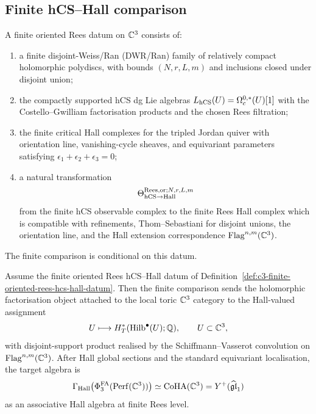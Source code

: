 \subsection*{Finite hCS--Hall comparison}

\begin{definition}
\label{def:c3-finite-oriented-rees-hcs-hall-datum}
A finite oriented Rees datum on $\mathbb{C}^3$ consists of:
\begin{enumerate}
\item a finite disjoint-Weiss/Ran (DWR/Ran) family of relatively
compact holomorphic polydiscs, with bounds $(N,r,L,m)$ and inclusions
closed under disjoint union;
\item the compactly supported hCS dg Lie algebras
$L_{\mathrm{hCS}}(U)=\Omega^{0,\ast}_c(U)[1]$ with the Costello--Gwilliam
factorisation products and the chosen Rees filtration;
\item the finite critical Hall complexes for the tripled Jordan quiver
with orientation line, vanishing-cycle sheaves, and equivariant
parameters satisfying $\epsilon_1+\epsilon_2+\epsilon_3=0$;
\item a natural transformation
\[
  \Theta_{\mathrm{hCS}\to\mathrm{Hall}}^{\mathrm{Rees,or};N,r,L,m}
\]
from the finite hCS observable complex to the finite Rees Hall complex
which is compatible with refinements, Thom--Sebastiani for disjoint
unions, the orientation line, and the Hall extension correspondence
$\mathrm{Flag}^{n,m}(\mathbb{C}^3)$.
\end{enumerate}
\end{definition}

The finite comparison is conditional on this datum.

\begin{theorem}
\label{thm:c3-finite-rees-hcs-hall-positive-half}
Assume the finite oriented Rees hCS--Hall datum of
Definition~\ref{def:c3-finite-oriented-rees-hcs-hall-datum}. Then the
finite comparison sends the holomorphic factorisation object attached
to the local toric $\mathbb{C}^3$ category to the Hall-valued assignment
\[
  U \longmapsto H^\ast_T(\mathrm{Hilb}^\bullet(U);\mathbb Q),
  \qquad U\subset \mathbb{C}^3,
\]
with disjoint-support product realised by the Schiffmann--Vasserot
convolution on $\mathrm{Flag}^{n,m}(\mathbb{C}^3)$. After Hall global sections
and the standard equivariant localisation, the target algebra is
\[
  \Gamma_{\mathrm{Hall}}\!\left(
    \Phi^{\mathrm{FA}}_3(\mathrm{Perf}(\mathbb{C}^3))
  \right)
  \simeq
  \mathrm{CoHA}(\mathbb{C}^3)
  =
  Y^{+}(\widehat{\mathfrak{gl}}_1)
\]
as an associative Hall algebra at finite Rees level.
\end{theorem}

